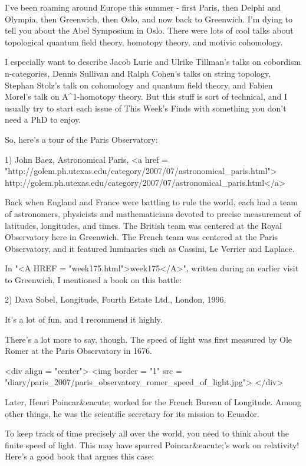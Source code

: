 


I've been roaming around Europe this summer - first Paris, then
Delphi and Olympia, then Greenwich, then Oslo, and now back to
Greenwich.  I'm dying to tell you about the Abel Symposium in 
Oslo.  There were lots of cool talks about topological quantum 
field theory, homotopy theory, and motivic cohomology.  

I especially want to describe
Jacob Lurie and Ulrike Tillman's talks on cobordism n-categories,
Dennis Sullivan and Ralph Cohen's talks on string topology,  
Stephan Stolz's
talk on cohomology and quantum field theory, and Fabien Morel's
talk on A^{1}-homotopy theory.
But this stuff is sort of technical, and
I usually try to start each issue of This Week's Finds with something
you don't need a PhD to enjoy.

So, here's a tour of the Paris Observatory:

1) John Baez, Astronomical Paris, <a href =
"http://golem.ph.utexas.edu/category/2007/07/astronomical_paris.html">
http://golem.ph.utexas.edu/category/2007/07/astronomical_paris.html</a>

Back when England and France were battling to rule the world, 
each had a team of astronomers, physicists and mathematicians
devoted to precise measurement of latitudes, longitudes, and times.
The British team was centered at the Royal Observatory here in 
Greenwich.  The French team was centered at the Paris Observatory,
and it featured luminaries such as Cassini, Le Verrier and Laplace.

In "<A HREF = "week175.html">week175</A>", written during an
earlier visit to Greenwich, I mentioned a book on this battle:

2) Dava Sobel, Longitude, Fourth Estate Ltd., London, 1996.

It's a lot of fun, and I recommend it highly.

There's a lot more to say, though.  The speed of light was first
measured by Ole Romer at the Paris Observatory in 1676.  


<div align = "center">
<img border = "1" src = "diary/paris_2007/paris_observatory_romer_speed_of_light.jpg">
</div>

Later,
Henri Poincar&eacute; worked for the French Bureau of Longitude.  Among
other things, he was the scientific secretary for its mission to 
Ecuador.  

To keep track of time precisely all over the world, you need to 
think about the finite speed of light.  This may have spurred 
Poincar&eacute;'s work on relativity!  Here's a good book that argues
this case:

